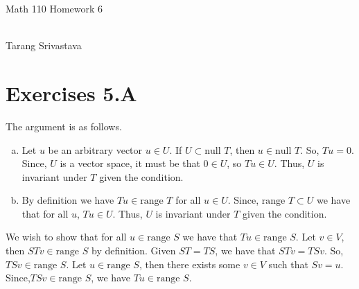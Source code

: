 \documentclass[10pt, twocolumn]{article}
\author{Tarang Srivastava}
\newcommand{\nul}{\text{null }}
\newcommand{\range}{\text{range }}
\newcommand{\makechaptertitle}[1]{
\begin{center}
	\begin{large}
		#1
	\end{large}
	\begin{small}
		\\Tarang Srivastava
	\end{small}
\end{center}
}
\begin{document}
\makechaptertitle{Math 110 Homework 6}

\section{Exercises 5.A}
\begin{q}[1]
	The argument is as follows.
	\begin{enumerate}[(a)]
		\item Let $ u $ be an arbitrary vector $ u \in U $.
		If $ U \subset \nul T $, then $ u \in \nul T $. 
		So, $ Tu = 0 $. Since, $ U $ is a vector space, it must be that $ 0 \in U $, so $ Tu \in U $.
		Thus, $ U $ is invariant under $ T $ given the condition.
		\item By definition we have $ Tu \in \range T $ for all $ u \in U $. 
		Since, $ \range T \subset U $ we have that for all $ u $, $ Tu \in U $. 
		Thus, $ U $ is invariant under $ T $ given the condition.
	\end{enumerate}
\end{q}
\begin{q}[3]
	We wish to show that for all $ u \in \range S $ we have that $ Tu \in \range S $. 
	Let $ v \in V $, then $ STv \in \range S $ by definition. 
	Given $ ST = TS $, we have that $ STv = TSv $. 
	So, $ TSv \in \range S $. 
	Let $ u \in \range S $, then there exists some $ v \in V $ such that $ Sv = u $. 
	Since,$ TSv \in \range S $, we have $ Tu \in \range S $.  
\end{q}
\end{document}

